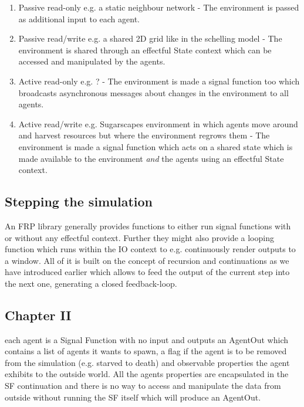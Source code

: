 \begin{enumerate}
	\item Passive read-only e.g. a static neighbour network - The environment is passed as additional input to each agent.
	\item Passive read/write e.g. a shared 2D grid like in the schelling model \cite{schelling_dynamic_1971} - The environment is shared through an effectful State context which can be accessed and manipulated by the agents.
	\item Active read-only e.g. ? - The environment is made a signal function too which broadcasts asynchronous messages about changes in the environment to all agents.
	\item Active read/write e.g. Sugarscapes environment in which agents move around and harvest resources but where the environment regrows them - The environment is made a signal function which acts on a shared state which is made available to the environment \textit{and} the agents using an effectful State context.
\end{enumerate}

\subsection{Stepping the simulation}
An FRP library generally provides functions to either run signal functions with or without any effectful context. Further they might also provide a looping function which runs within the IO context to e.g. continuously render outputs to a window. All of it is built on the concept of recursion and continuations as we have introduced earlier which allows to feed the output of the current step into the next one, generating a closed feedback-loop.



\subsection{Chapter II}
each agent is a Signal Function with no input and outputs an AgentOut which contains a list of agents it wants to spawn, a flag if the agent is to be removed from the simulation (e.g. starved to death) and observable properties the agent exhibits to the outside world. All the agents properties are encapsulated in the SF continuation and there is no way to access and manipulate the data from outside without running the SF itself which will produce an AgentOut.

